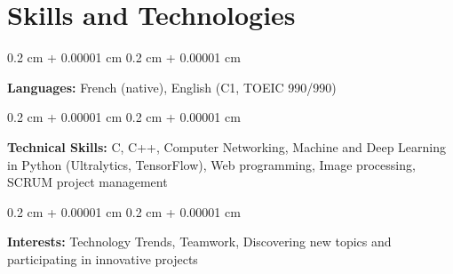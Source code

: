 \documentclass[10pt, letterpaper]{article}
\newenvironment{onecolentry}{
    \begin{adjustwidth}{
        0.2 cm + 0.00001 cm
    }{
        0.2 cm + 0.00001 cm
    }
}{
    \end{adjustwidth}
} %
\begin{document}
	
    \section{Skills and Technologies}
        \begin{onecolentry}
            \textbf{Languages:} French (native), English (C1, TOEIC 990/990) 
        \end{onecolentry}

        \vspace{0.2 cm}

        \begin{onecolentry}
            \textbf{Technical Skills:} C, C++, Computer Networking, Machine and Deep Learning in Python (Ultralytics, TensorFlow), Web programming, Image processing, SCRUM project management
        \end{onecolentry}

		\vspace{0.2 cm}

        \begin{onecolentry}
            \textbf{Interests:} Technology Trends, Teamwork, Discovering new topics and participating in innovative projects
        \end{onecolentry}
\end{document}

